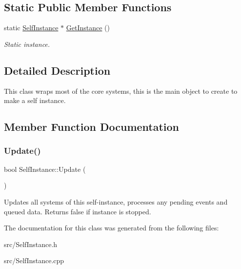 \subsection*{Static Public Member Functions}
\begin{DoxyCompactItemize}
\item 
\mbox{\label{class_self_instance_a13bb9a0ddd2b583b4f14440e2dcdea6c}} 
static \hyperlink{class_self_instance}{Self\+Instance} $\ast$ \hyperlink{class_self_instance_a13bb9a0ddd2b583b4f14440e2dcdea6c}{Get\+Instance} ()
\begin{DoxyCompactList}\small\item\em Static instance. \end{DoxyCompactList}\end{DoxyCompactItemize}


\subsection{Detailed Description}
This class wraps most of the core systems, this is the main object to create to make a self instance. 

\subsection{Member Function Documentation}
\mbox{\label{class_self_instance_aab86fc32f63c281ad897215e0b54631e}} 
\subsubsection{\texorpdfstring{Update()}{Update()}}
{\footnotesize\ttfamily bool Self\+Instance\+::\+Update (\begin{DoxyParamCaption}{ }\end{DoxyParamCaption})}

Updates all systems of this self-\/instance, processes any pending events and queued data. Returns false if instance is stopped. 

The documentation for this class was generated from the following files\+:\begin{DoxyCompactItemize}
\item 
src/Self\+Instance.\+h\item 
src/Self\+Instance.\+cpp\end{DoxyCompactItemize}
